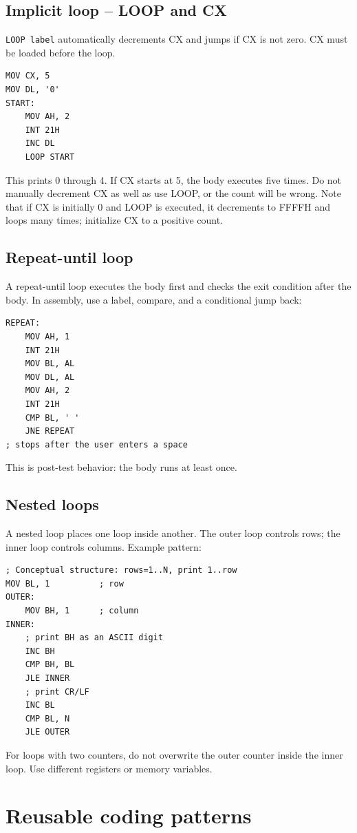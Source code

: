 \documentclass[11pt,a4paper]{article}
\begin{document}
\subsection{Implicit loop -- LOOP and CX}
\texttt{LOOP label} automatically decrements CX and jumps if CX is not zero. CX must be loaded before the loop.
\begin{lstlisting}[style=asm]
MOV CX, 5
MOV DL, '0'
START:
    MOV AH, 2
    INT 21H
    INC DL
    LOOP START
\end{lstlisting}
This prints 0 through 4. If CX starts at 5, the body executes five times. Do not manually decrement CX as well as use LOOP, or the count will be wrong. Note that if CX is initially 0 and LOOP is executed, it decrements to FFFFH and loops many times; initialize CX to a positive count.

\subsection{Repeat-until loop}
A repeat-until loop executes the body first and checks the exit condition after the body. In assembly, use a label, compare, and a conditional jump back:
\begin{lstlisting}[style=asm]
REPEAT:
    MOV AH, 1
    INT 21H
    MOV BL, AL
    MOV DL, AL
    MOV AH, 2
    INT 21H
    CMP BL, ' '
    JNE REPEAT
; stops after the user enters a space
\end{lstlisting}
This is post-test behavior: the body runs at least once.

\subsection{Nested loops}
A nested loop places one loop inside another. The outer loop controls rows; the inner loop controls columns. Example pattern:
\begin{lstlisting}[style=asm]
; Conceptual structure: rows=1..N, print 1..row
MOV BL, 1          ; row
OUTER:
    MOV BH, 1      ; column
INNER:
    ; print BH as an ASCII digit
    INC BH
    CMP BH, BL
    JLE INNER
    ; print CR/LF
    INC BL
    CMP BL, N
    JLE OUTER
\end{lstlisting}
For loops with two counters, do not overwrite the outer counter inside the inner loop. Use different registers or memory variables.

\section{Reusable coding patterns}
\end{document}
